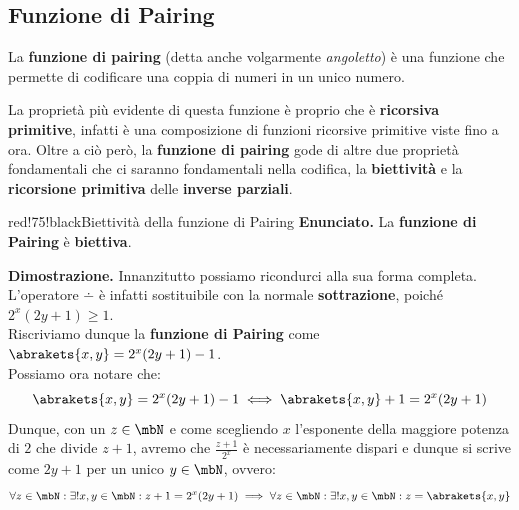 \subsection{Funzione di Pairing}

La \textbf{funzione di pairing} (detta anche volgarmente \textit{angoletto}) è una funzione che permette di codificare una coppia di numeri in un unico numero.
%

La proprietà più evidente di questa funzione è proprio che è \textbf{ricorsiva primitive}, infatti è una composizione di funzioni ricorsive primitive viste fino a ora.
Oltre a ciò però, la \textbf{funzione di pairing} gode di altre due proprietà fondamentali che ci saranno fondamentali nella codifica, la \textbf{biettività} e la \textbf{ricorsione primitiva} delle \textbf{inverse parziali}.

\begin{halfframedbox}{red!75!black}{Biettività della funzione di Pairing}\label{Biettività della funzione di Pairing}
  \textbf{Enunciato.} La \textbf{funzione di Pairing} è \textbf{biettiva}.
  \begin{center}
    \textcolor{red!75!black}{\hdashrule[0.5ex]{18cm}{1pt}{3mm 3pt 1mm 2pt}}
  \end{center}

  \textbf{Dimostrazione.} Innanzitutto possiamo ricondurci alla sua forma completa. L'operatore \(\dotminus\) è infatti sostituibile con la normale \textbf{sottrazione}, poiché \(2^x(2y+1)\geq 1\).\\
   Riscriviamo dunque la \textbf{funzione di Pairing} come \(\abrakets{ x,y } =2^x(2y+1)-1\).\\
   Possiamo ora notare che:
   \begin{equation}
    \abrakets{ x,y } =2^x(2y+1)-1 \iff \abrakets{ x,y } +1= 2^x(2y+1)
   \end{equation}
   Dunque, con un \(z\in\mbN\) e come scegliendo \(x\) l'esponente della maggiore potenza di \(2\) che divide \(z+1\), avremo che \(\frac{z+1}{2^x}\) è necessariamente dispari e dunque si scrive come \(2y+1\) per un unico \(y\in\mbN\), ovvero:
   \begin{equation}
    \forall z \in \mbN: \exists! x,y \in \mbN: z+1=2^x(2y+1)\implies \forall z \in \mbN: \exists! x,y \in \mbN: z=\abrakets{ x,y }
   \end{equation}
\end{halfframedbox}

